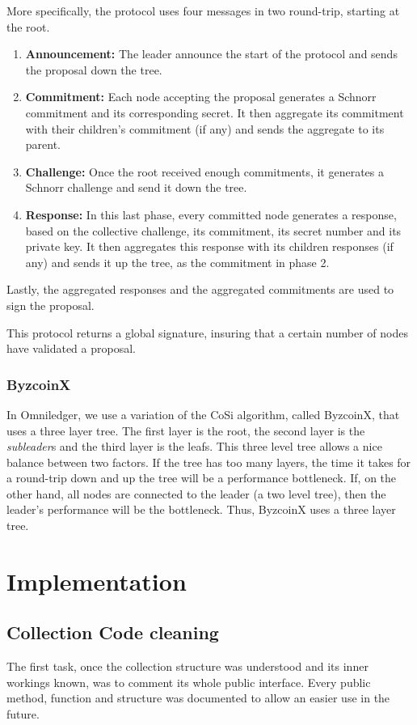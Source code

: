 \documentclass[11pt, a4paper, twoside, openright]{article}
\begin{document}
More specifically, the protocol uses four messages in two round-trip, starting at the root.
\begin{enumerate} 
\itemsep0em
 \item \textbf{Announcement:} The leader announce the start of the protocol and sends the proposal down the tree.
\item \textbf{Commitment:} Each node accepting the proposal generates a Schnorr commitment and its corresponding secret. It then aggregate its commitment with their children's commitment (if any) and sends the aggregate to its parent.
\item \textbf{Challenge:} Once the root received enough commitments, it generates a Schnorr challenge and send it down the tree.
\item \textbf{Response:} In this last phase, every committed node generates a response, based on the collective challenge, its commitment, its secret number and its private key. It then aggregates this response with its children responses (if any) and sends it up the tree, as the commitment in phase 2.
\end{enumerate}
Lastly, the aggregated responses and the aggregated commitments are used to sign the proposal.

This protocol returns a global signature, insuring that a certain number of nodes have validated a proposal.

\subsubsection{ByzcoinX}
\label{ByzcoinX}
In Omniledger, we use a variation of the CoSi algorithm, called ByzcoinX, that uses a three layer tree. The first layer is the root, the second layer is the \textit{subleader}s and the third layer is the leafs. This three level tree allows a nice balance between two factors. If the tree has too many layers, the time it takes for a round-trip down and up the tree will be a performance bottleneck. If, on the other hand, all nodes are connected to the leader (a two level tree), then the leader's performance will be the bottleneck. Thus, ByzcoinX uses a three layer tree.

\section{Implementation}
\subsection{Collection Code cleaning}
The first task, once the collection structure was understood and its inner workings known, was to comment its whole public interface. Every public method, function and structure was documented to allow an easier use in the future.
\end{document}
